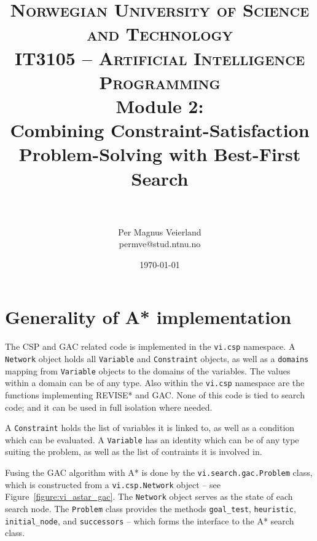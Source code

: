 

\usepackage{float}

\title{	
\normalfont \normalsize 
\textsc{Norwegian University of Science and Technology\\IT3105 -- Artificial Intelligence Programming}
\horrule{0.5pt} \\[0.4cm]
\huge Module 2:\\Combining Constraint-Satisfaction Problem-Solving with Best-First
Search\\
\horrule{2pt} \\[0.5cm]
}

\author{Per Magnus Veierland\\permve@stud.ntnu.no}

\date{\normalsize\today}




\maketitle

\section*{Generality of A* implementation}

The \ac{CSP} and \ac{GAC} related code is implemented in the \texttt{vi.csp} namespace. A \texttt{Network} object holds all \texttt{Variable} and \texttt{Constraint} objects, as well as a \texttt{domains} mapping from \texttt{Variable} objects to the domains of the variables. The values within a domain can be of any type. Also within the \texttt{vi.csp} namespace are the functions implementing \textsc{REVISE*} and \ac{GAC}. None of this code is tied to search code; and it can be used in full isolation where needed.

A \texttt{Constraint} holds the list of variables it is linked to, as well as a condition which can be evaluated. A \texttt{Variable} has an identity which can be of any type suiting the problem, as well as the list of contraints it is involved in.

Fusing the \ac{GAC} algorithm with A* is done by the \texttt{vi.search.gac.Problem} class, which is constructed from a \texttt{vi.csp.Network} object -- see Figure~\ref{figure:vi_astar_gac}. The \texttt{Network} object serves as the state of each search node. The \texttt{Problem} class provides the methods \texttt{goal\_test}, \texttt{heuristic}, \texttt{initial\_node}, and \texttt{successors} -- which forms the interface to the A* search class.

